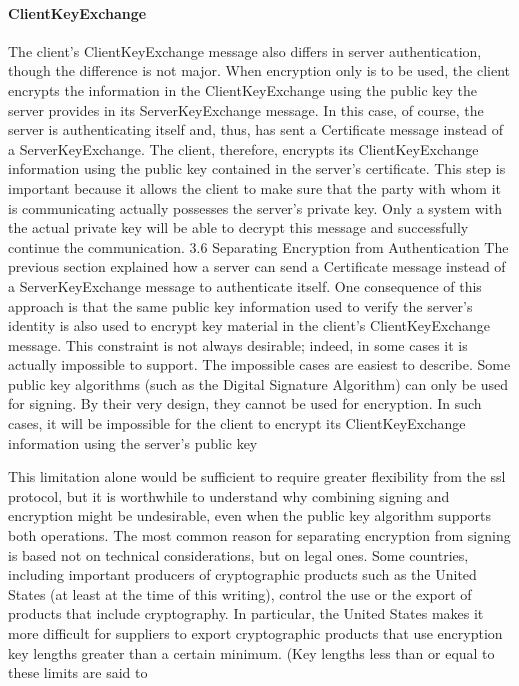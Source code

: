\paragraph{ClientKeyExchange}
The client’s ClientKeyExchange message also differs in server authentication, though the difference is not major. When encryption
only is to be used, the client encrypts the information in the ClientKeyExchange using the public key the server provides in its
ServerKeyExchange message. In this case, of course, the server is authenticating itself and, thus, has sent a Certificate message instead of
a ServerKeyExchange. The client, therefore, encrypts its ClientKeyExchange information using the public key contained in the
server’s certificate. This step is important because it allows the client
to make sure that the party with whom it is communicating actually
possesses the server’s private key. Only a system with the actual private key will be able to decrypt this message and successfully continue the communication.
3.6 Separating Encryption from Authentication
The previous section explained how a server can send a Certificate
message instead of a ServerKeyExchange message to authenticate itself. One consequence of this approach is that the same public key
information used to verify the server’s identity is also used to encrypt
key material in the client’s ClientKeyExchange message. This constraint is not always desirable; indeed, in some cases it is actually impossible to support.
The impossible cases are easiest to describe. Some public key algorithms (such as the Digital Signature Algorithm) can only be used
for signing. By their very design, they cannot be used for encryption.
In such cases, it will be impossible for the client to encrypt its ClientKeyExchange information using the server’s public key

This limitation alone would be sufficient to require greater flexibility
from the ssl protocol, but it is worthwhile to understand why combining signing and encryption might be undesirable, even when the
public key algorithm supports both operations. The most common
reason for separating encryption from signing is based not on technical considerations, but on legal ones. Some countries, including important producers of cryptographic products such as the United
States (at least at the time of this writing), control the use or the export of products that include cryptography. In particular, the United
States makes it more difficult for suppliers to export cryptographic
products that use encryption key lengths greater than a certain
minimum. (Key lengths less than or equal to these limits are said to

